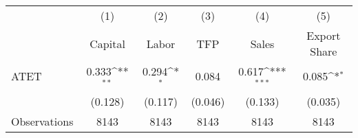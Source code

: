 {
\def\sym#1{\ifmmode^{#1}\else\(^{#1}\)\fi}
\begin{tabular}{l*{5}{c}}
\hline\hline
                    &\multicolumn{1}{c}{(1)}&\multicolumn{1}{c}{(2)}&\multicolumn{1}{c}{(3)}&\multicolumn{1}{c}{(4)}&\multicolumn{1}{c}{(5)}\\
                    &\multicolumn{1}{c}{Capital}&\multicolumn{1}{c}{Labor}&\multicolumn{1}{c}{TFP}&\multicolumn{1}{c}{Sales}&\multicolumn{1}{c}{Export Share}\\
\hline
ATET                &       0.333\sym{**} &       0.294\sym{*}  &       0.084         &       0.617\sym{***}&       0.085\sym{*}  \\
                    &     (0.128)         &     (0.117)         &     (0.046)         &     (0.133)         &     (0.035)         \\
\hline
Observations        &        8143         &        8143         &        8143         &        8143         &        8143         \\
\hline\hline
\end{tabular}
}
